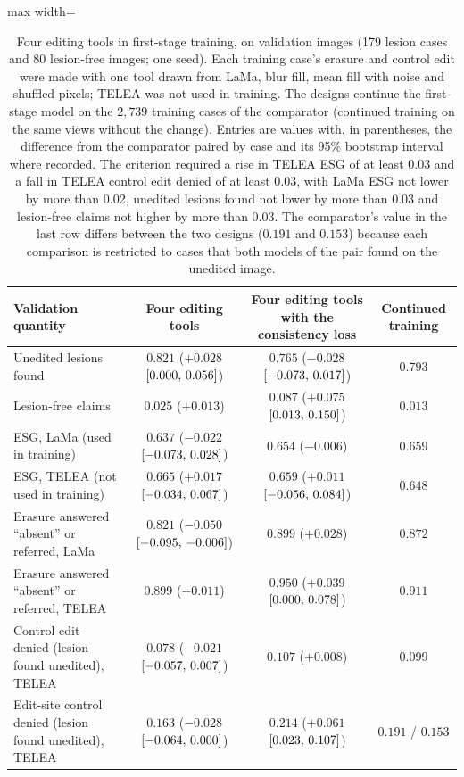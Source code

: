 \begin{table}[!htbp]
\caption{Four editing tools in first-stage training, on validation images (179 lesion cases and 80 lesion-free images; one seed). Each training case's erasure and control edit were made with one tool drawn from LaMa, blur fill, mean fill with noise and shuffled pixels; TELEA was not used in training. The designs continue the first-stage model on the $2{,}739$ training cases of the comparator (continued training on the same views without the change). Entries are values with, in parentheses, the difference from the comparator paired by case and its 95\% bootstrap interval where recorded. The criterion required a rise in TELEA ESG of at least 0.03 and a fall in TELEA control edit denied of at least 0.03, with LaMa ESG not lower by more than 0.02, unedited lesions found not lower by more than 0.03 and lesion-free claims not higher by more than 0.03. The comparator's value in the last row differs between the two designs ($0.191$ and $0.153$) because each comparison is restricted to cases that both models of the pair found on the unedited image.}
\label{tab:s_designs_tools}
\centering
\footnotesize
\begin{adjustbox}{max width=\linewidth}
\begin{tabular}{lccc}
\toprule
Validation quantity & Four editing tools & Four editing tools with the consistency loss & Continued training \\
\midrule
Unedited lesions found & $0.821$ ($+0.028$ $[0.000,\,0.056]$) & $0.765$ ($-0.028$ $[-0.073,\,0.017]$) & $0.793$ \\
Lesion-free claims & $0.025$ ($+0.013$) & $0.087$ ($+0.075$ $[0.013,\,0.150]$) & $0.013$ \\
ESG, LaMa (used in training) & $0.637$ ($-0.022$ $[-0.073,\,0.028]$) & $0.654$ ($-0.006$) & $0.659$ \\
ESG, TELEA (not used in training) & $0.665$ ($+0.017$ $[-0.034,\,0.067]$) & $0.659$ ($+0.011$ $[-0.056,\,0.084]$) & $0.648$ \\
Erasure answered ``absent'' or referred, LaMa & $0.821$ ($-0.050$ $[-0.095,\,-0.006]$) & $0.899$ ($+0.028$) & $0.872$ \\
Erasure answered ``absent'' or referred, TELEA & $0.899$ ($-0.011$) & $0.950$ ($+0.039$ $[0.000,\,0.078]$) & $0.911$ \\
Control edit denied (lesion found unedited), TELEA & $0.078$ ($-0.021$ $[-0.057,\,0.007]$) & $0.107$ ($+0.008$) & $0.099$ \\
Edit-site control denied (lesion found unedited), TELEA & $0.163$ ($-0.028$ $[-0.064,\,0.000]$) & $0.214$ ($+0.061$ $[0.023,\,0.107]$) & $0.191$ / $0.153$ \\
\bottomrule
\end{tabular}
\end{adjustbox}
\end{table}

